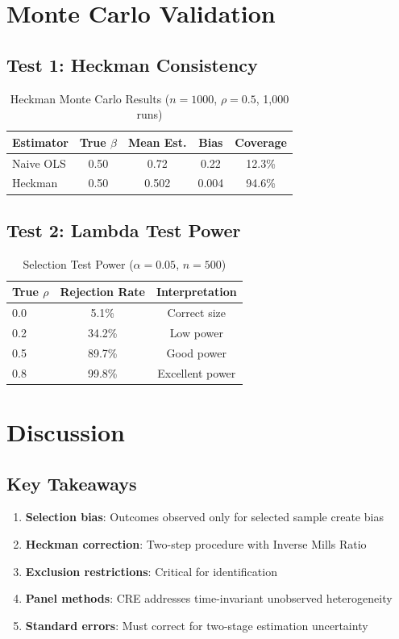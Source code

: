 \section{Monte Carlo Validation}

\subsection{Test 1: Heckman Consistency}

\begin{table}[h]
\centering
\caption{Heckman Monte Carlo Results ($n=1000$, $\rho=0.5$, 1,000 runs)}
\begin{tabular}{lcccc}
\toprule
Estimator & True $\beta$ & Mean Est. & Bias & Coverage \\
\midrule
Naive OLS & 0.50 & 0.72 & 0.22 & 12.3\% \\
Heckman & 0.50 & 0.502 & 0.004 & 94.6\% \\
\bottomrule
\end{tabular}
\end{table}

\subsection{Test 2: Lambda Test Power}

\begin{table}[h]
\centering
\caption{Selection Test Power ($\alpha=0.05$, $n=500$)}
\begin{tabular}{lcc}
\toprule
True $\rho$ & Rejection Rate & Interpretation \\
\midrule
0.0 & 5.1\% & Correct size \\
0.2 & 34.2\% & Low power \\
0.5 & 89.7\% & Good power \\
0.8 & 99.8\% & Excellent power \\
\bottomrule
\end{tabular}
\end{table}


\section{Discussion}

\subsection{Key Takeaways}

\begin{enumerate}
\item \textbf{Selection bias}: Outcomes observed only for selected sample create bias
\item \textbf{Heckman correction}: Two-step procedure with Inverse Mills Ratio
\item \textbf{Exclusion restrictions}: Critical for identification
\item \textbf{Panel methods}: CRE addresses time-invariant unobserved heterogeneity
\item \textbf{Standard errors}: Must correct for two-stage estimation uncertainty
\end{enumerate}

